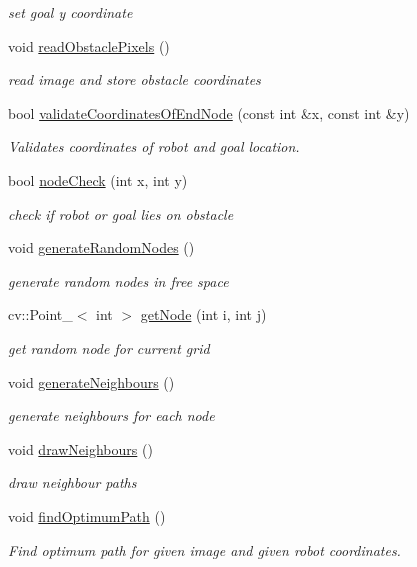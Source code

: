 \begin{DoxyCompactItemize}
\begin{DoxyCompactList}\small\item\em set goal y coordinate \end{DoxyCompactList}\item 
void \mbox{\hyperlink{classMap_a9d1151b9e6dade109c4448db724e02aa}{read\+Obstacle\+Pixels}} ()
\begin{DoxyCompactList}\small\item\em read image and store obstacle coordinates \end{DoxyCompactList}\item 
bool \mbox{\hyperlink{classMap_a6b8d35e143f94303278b4ba3e8e9a254}{validate\+Coordinates\+Of\+End\+Node}} (const int \&x, const int \&y)
\begin{DoxyCompactList}\small\item\em Validates coordinates of robot and goal location. \end{DoxyCompactList}\item 
bool \mbox{\hyperlink{classMap_a4f6c50a5e192f6bf465c4dd6cb4a8806}{node\+Check}} (int x, int y)
\begin{DoxyCompactList}\small\item\em check if robot or goal lies on obstacle \end{DoxyCompactList}\item 
void \mbox{\hyperlink{classMap_a954ff479022d478a670326956a7223f6}{generate\+Random\+Nodes}} ()
\begin{DoxyCompactList}\small\item\em generate random nodes in free space \end{DoxyCompactList}\item 
cv\+::\+Point\+\_\+$<$ int $>$ \mbox{\hyperlink{classMap_aa0047c676dba81c3475e809b34620819}{get\+Node}} (int i, int j)
\begin{DoxyCompactList}\small\item\em get random node for current grid \end{DoxyCompactList}\item 
void \mbox{\hyperlink{classMap_abd300715e729b523e97397bf11d536ea}{generate\+Neighbours}} ()
\begin{DoxyCompactList}\small\item\em generate neighbours for each node \end{DoxyCompactList}\item 
void \mbox{\hyperlink{classMap_a8462d10dd3bdcf2c1977ab486186c51f}{draw\+Neighbours}} ()
\begin{DoxyCompactList}\small\item\em draw neighbour paths \end{DoxyCompactList}\item 
void \mbox{\hyperlink{classMap_a39500861019ef53953b146923dbba271}{find\+Optimum\+Path}} ()
\begin{DoxyCompactList}\small\item\em Find optimum path for given image and given robot coordinates. \end{DoxyCompactList}\end{DoxyCompactItemize}
